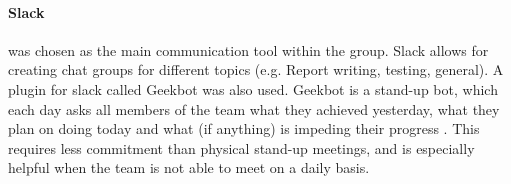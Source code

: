 \paragraph{Slack} was chosen as the main communication tool within the group. Slack allows for creating chat groups for different topics (e.g. Report writing, testing, general). A plugin for slack called Geekbot was also used. Geekbot is a stand-up bot, which each day asks all members of the team what they achieved yesterday, what they plan on doing today and what (if anything) is impeding their progress \citep{geekbot}. This requires less commitment than physical stand-up meetings, and is especially helpful when the team is not able to meet on a daily basis. 